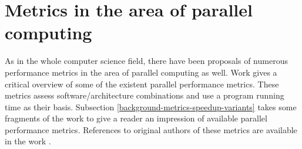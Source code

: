 \section{Metrics in the area of parallel computing}
\label{background-metrics-parallel-computing}
\qquad As in the whole computer science field, there have been proposals of numerous performance metrics in the area of parallel computing as well. Work \cite{parallel-performance-metrics-paper} gives a critical overview of some of the existent parallel performance metrics. These metrics assess software/architecture combinations and use a program running time as their basis. Subsection \ref{background-metrics-speedup-variants} takes some fragments of the work \cite{parallel-performance-metrics-paper} to give a reader an impression of available parallel performance metrics. References to original authors of these metrics are available in the work \cite{parallel-performance-metrics-paper}.     

